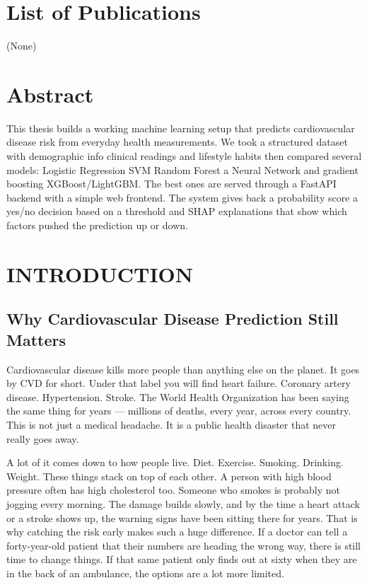 \documentclass[12pt, a4paper, oneside]{book}
\begin{document}
\clearpage
\thispagestyle{plain}
\chapter*{List of Publications}
(None)

\chapter*{Abstract}
This thesis builds a working machine learning setup that predicts cardiovascular disease risk from everyday health measurements. We took a structured dataset with demographic info clinical readings and lifestyle habits then compared several models: Logistic Regression SVM Random Forest a Neural Network and gradient boosting XGBoost/LightGBM. The best ones are served through a FastAPI backend with a simple web frontend. The system gives back a probability score a yes/no decision based on a threshold and SHAP explanations that show which factors pushed the prediction up or down.

\mainmatter
{}

\chapter{INTRODUCTION}

\section{Why Cardiovascular Disease Prediction Still Matters}
Cardiovascular disease kills more people than anything else on the planet. It goes by CVD for short. Under that label you will find heart failure. Coronary artery disease. Hypertension. Stroke. The World Health Organization has been saying the same thing for years — millions of deaths, every year, across every country. This is not just a medical headache. It is a public health disaster that never really goes away.

A lot of it comes down to how people live. Diet. Exercise. Smoking. Drinking. Weight. These things stack on top of each other. A person with high blood pressure often has high cholesterol too. Someone who smokes is probably not jogging every morning. The damage builds slowly, and by the time a heart attack or a stroke shows up, the warning signs have been sitting there for years. That is why catching the risk early makes such a huge difference. If a doctor can tell a forty-year-old patient that their numbers are heading the wrong way, there is still time to change things. If that same patient only finds out at sixty when they are in the back of an ambulance, the options are a lot more limited.
\end{document}
